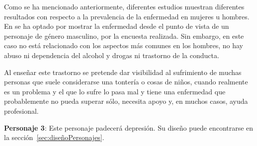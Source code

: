 \documentclass[12pt, a4paper,twoside,titlepage]{book}
\begin{document}
\begin{itemize}
Como se ha mencionado anteriormente, diferentes estudios muestran diferentes resultados con respecto a la prevalencia de la enfermedad en mujeres u hombres. En  se ha optado por mostrar la enfermedad desde el punto de vista de un personaje de género masculino, por la encuesta realizada. Sin embargo, en este caso no está relacionado con los aspectos más comunes en los hombres, no hay abuso ni dependencia del alcohol y drogas ni trastorno de la conducta.  


Al enseñar este trastorno se pretende dar visibilidad al sufrimiento de muchas personas que suele considerarse una tontería o cosas de niños, cuando realmente es un problema y el que lo sufre lo pasa mal y tiene una enfermedad que probablemente no pueda superar sólo, necesita apoyo y, en muchos casos, ayuda profesional.

     
\end{itemize}




\textbf{Personaje 3}: Este personaje padecerá depresión. Su diseño puede encontrarse en la sección~\ref{sec:diseñoPersonajes}.
\end{document}
